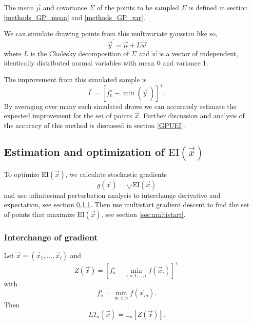 The mean $\vec{\mu}$ and covariance $\Sigma$ of the points to be sampled $\Sigma$ is defined in section \ref{methods_GP_mean} and \ref{methods_GP_var}.

We can simulate drawing points from this multivariate gaussian like so,
\begin{equation}
    \vec{y}^{\prime} = \vec{\mu} + L \vec{w}
\end{equation}
where $L$ is the Cholesky decomposition of $\Sigma$ and $\vec{w}$ is a vector of independent, identically distributed normal variables with mean 0 and variance 1.

The improvement from this simulated sample is
\begin{equation}
    I^{\prime} = \left[f_{n}^{\star} - \min(\vec{y}^{\prime})\right]^{+}.
\end{equation}
By averaging over many such simulated draws we can accurately estimate the expected improvement for the set of points $\vec{x}$. Further discussion and analysis of the accuracy of this method is discussed in section \ref{GPUEI}.


\subsection{Estimation and optimization of $\mbox{EI}(\vec{x})$}

To optimize $\mbox{EI}(\vec{x})$, we calculate stochastic gradients
\begin{equation}
 g(\vec{x}) = \bigtriangledown \mbox{EI}(\vec{x})
\end{equation}
and use infinitesimal perturbation analysis \cite{Fu1994} to interchange derivative and expectation, see section \ref{EPI_proof}. Then use multistart gradient descent to find the set of points that maximize $\mbox{EI}(\vec{x})$, see section \ref{sec:multistart}.

\subsubsection{Interchange of gradient}
\label{EPI_proof}

Let $\vec{x} = \left(\vec{x}_{1}, \ldots, \vec{x}_{l}\right)$ and
\begin{equation}
    Z \left(\vec{x}\right) = \left[f_{n}^{\star} - \min_{i = 1,\ldots,l} f \left(\vec{x}_{i}\right)\right]^{+}
\end{equation}
with
\begin{equation}
    f_{n}^{\star} = \min_{m\leq n} f \left(\vec{x}_{m}\right).
\end{equation}
Then
\begin{equation}
    EI_{n}(\vec{x}) = \mathbb{E}_{n}\left[Z \left(\vec{x}\right)\right].
\end{equation}

